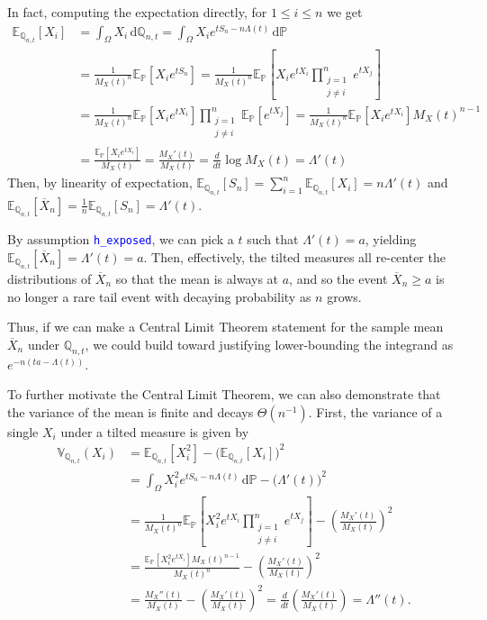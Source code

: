 \documentclass{article}
\newcommand{\leancode}[1]{\textcolor{blue}{\nolinkurl{#1}}}
\newcommand{\E}{\mathbb{E}}
\renewcommand{\P}{\mathbb{P}}
\newcommand{\Q}{\mathbb{Q}}
\newcommand{\Var}{\mathbb{V}}
\begin{document}
In fact, computing the expectation directly, for $1 \le i \le n$ we get
\begin{equation}
  \begin{aligned}
    \E_{\Q_{n,t}}[X_i] &= \int_\Omega X_i \, \text{d}\Q_{n,t} = \int_\Omega X_i e^{t S_n - n \Lambda(t)} \, \text{d}\P \\
    &= \frac{1}{M_X(t)^n} \E_\P[X_i e^{t S_n}] = \frac{1}{M_X(t)^n} \E_\P\left[X_i e^{t X_i} \prod_{\substack{j=1 \\ j \ne i}}^{n} e^{t X_j}\right] \\
    &= \frac{1}{M_X(t)^n} \E_\P[X_i e^{t X_i}] \prod_{\substack{j=1 \\ j \ne i}}^{n} \E_\P[e^{t X_j}] = \frac{1}{M_X(t)^n} \E_\P[X_i e^{t X_i}] M_X(t)^{n-1} \\
    &= \frac{\E_\P[X_i e^{t X_i}]}{M_X(t)} = \frac{M_X'(t)}{M_X(t)} = \frac{d}{dt} \log M_X(t) = \Lambda'(t)
  \end{aligned}
\end{equation}
Then, by linearity of expectation,
$\E_{\Q_{n,t}}[S_n] = \sum_{i=1}^n\E_{\Q_{n,t}}[X_i] = n\Lambda'(t)$
and $\E_{\Q_{n,t}}[\overline{X}_n] = \frac{1}{n}\E_{\Q_{n,t}}[S_n] = \Lambda'(t)$.

By assumption \leancode{h\_exposed}, we can pick a $t$ such that $\Lambda'(t) = a$, yielding
$\E_{\Q_{n,t}}[\overline{X}_n] = \Lambda'(t) = a$. Then, effectively, the tilted measures all re-center the distributions of $\overline{X}_n$ so that the mean is always at $a$, and so the event $\overline{X}_n \ge a$ is no longer a rare tail event with decaying probability as $n$ grows.

Thus, if we can make a Central Limit Theorem statement for the sample mean $\overline{X}_n$ under
$\Q_{n,t}$, we could build toward justifying lower-bounding the integrand as $e^{-n(ta - \Lambda(t))}$.

To further motivate the Central Limit Theorem, we can also demonstrate that the variance of the mean
is finite and decays $\Theta(n^{-1})$. First, the variance of a single $X_i$ under a tilted
measure is given by
\begin{equation}
  \begin{aligned}
    \Var_{\Q_{n,t}}(X_i) &= \E_{\Q_{n,t}}[X_i^2] - \big(\E_{\Q_{n,t}}[X_i]\big)^2 \\
    &= \int_\Omega X_i^2 e^{t S_n - n \Lambda(t)} \, \text{d}\P - \big(\Lambda'(t)\big)^2 \\
    &= \frac{1}{M_X(t)^n} \E_\P\left[X_i^2 e^{t X_i} \prod_{\substack{j=1 \\ j \ne i}}^{n} e^{t X_j}\right] - \left(\frac{M_X'(t)}{M_X(t)}\right)^2 \\
    &= \frac{\E_\P[X_i^2 e^{t X_i}] M_X(t)^{n-1}}{M_X(t)^n} - \left(\frac{M_X'(t)}{M_X(t)}\right)^2 \\
    &= \frac{M_X''(t)}{M_X(t)} - \left(\frac{M_X'(t)}{M_X(t)}\right)^2 = \frac{d}{dt} \left( \frac{M_X'(t)}{M_X(t)} \right) = \Lambda''(t).
  \end{aligned}
\end{equation}
\end{document}
